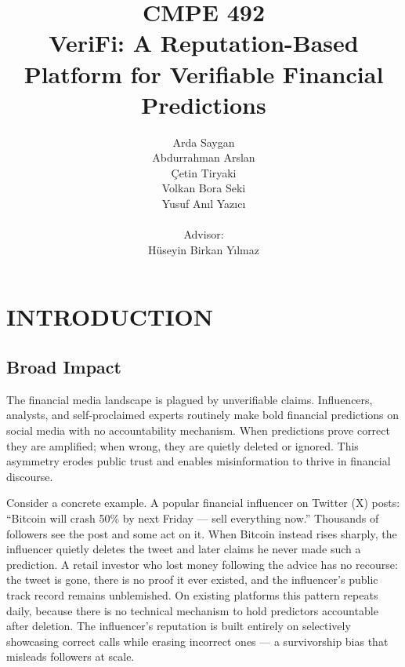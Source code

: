 \documentclass[a4paper,12pt]{report}
\begin{document}
\title{CMPE 492 \\ VeriFi: A Reputation-Based Platform for Verifiable Financial Predictions}
\author{
Arda Saygan \\
Abdurrahman Arslan \\
\c{C}etin Tiryaki \\
Volkan Bora Seki \\
Yusuf An\i{}l Yaz\i{}c\i{} \\ \\
Advisor: \\
H\"{u}seyin Birkan Y\i{}lmaz
}
\date{}
\maketitle{}
\tableofcontents

\chapter{INTRODUCTION}

\section{Broad Impact}

The financial media landscape is plagued by unverifiable claims. Influencers, analysts, and self-proclaimed experts routinely make bold financial predictions on social media with no accountability mechanism. When predictions prove correct they are amplified; when wrong, they are quietly deleted or ignored. This asymmetry erodes public trust and enables misinformation to thrive in financial discourse.

Consider a concrete example. A popular financial influencer on Twitter (X) posts: ``Bitcoin will crash 50\% by next Friday --- sell everything now.'' Thousands of followers see the post and some act on it. When Bitcoin instead rises sharply, the influencer quietly deletes the tweet and later claims he never made such a prediction. A retail investor who lost money following the advice has no recourse: the tweet is gone, there is no proof it ever existed, and the influencer's public track record remains unblemished. On existing platforms this pattern repeats daily, because there is no technical mechanism to hold predictors accountable after deletion. The influencer's reputation is built entirely on selectively showcasing correct calls while erasing incorrect ones --- a survivorship bias that misleads followers at scale.
\end{document}
